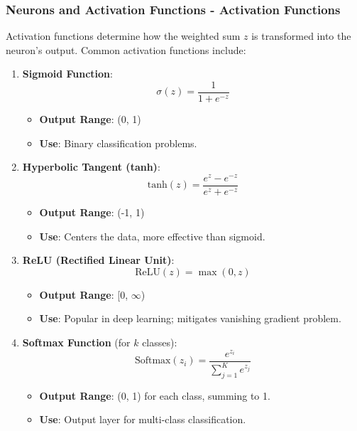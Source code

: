 \documentclass[aspectratio=169]{beamer}
\begin{document}
\begin{frame}[fragile]
    \frametitle{Neurons and Activation Functions - Activation Functions}
    Activation functions determine how the weighted sum \( z \) is transformed into the neuron's output. Common activation functions include:

    \begin{enumerate}
        \item \textbf{Sigmoid Function}:
        \[
        \sigma(z) = \frac{1}{1 + e^{-z}}
        \]
        \begin{itemize}
            \item \textbf{Output Range}: (0, 1)
            \item \textbf{Use}: Binary classification problems.
        \end{itemize}

        \item \textbf{Hyperbolic Tangent (tanh)}:
        \[
        \text{tanh}(z) = \frac{e^{z} - e^{-z}}{e^{z} + e^{-z}}
        \]
        \begin{itemize}
            \item \textbf{Output Range}: (-1, 1)
            \item \textbf{Use}: Centers the data, more effective than sigmoid.
        \end{itemize}

        \item \textbf{ReLU (Rectified Linear Unit)}:
        \[
        \text{ReLU}(z) = \max(0, z)
        \]
        \begin{itemize}
            \item \textbf{Output Range}: [0, $\infty$)
            \item \textbf{Use}: Popular in deep learning; mitigates vanishing gradient problem.
        \end{itemize}

        \item \textbf{Softmax Function} (for $k$ classes):
        \[
        \text{Softmax}(z_i) = \frac{e^{z_i}}{\sum_{j=1}^{K} e^{z_j}}
        \]
        \begin{itemize}
            \item \textbf{Output Range}: (0, 1) for each class, summing to 1.
            \item \textbf{Use}: Output layer for multi-class classification.
        \end{itemize}
    \end{enumerate}
\end{frame}
\end{document}
